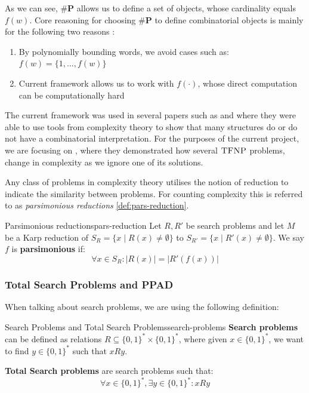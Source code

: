 As we can see, $\textbf{\#P}$ allows us to define a set of objects,
whose cardinality equals $f(w)$. Core reasoning for choosing
$\textbf{\#P}$ to define combinatorial objects is mainly for the 
following two reasons \cite{ikenmeyer_PositivitySymmetricGroup_2024}: 

\begin{enumerate}
    \item By polynomially bounding words, we avoid cases such as: $f(w) = \{1, \hdots, f(w)\}$
    \item Current framework allows us to work with $f(\cdot)$, whose direct computation can be computationally hard
\end{enumerate}


The current framework was used in several papers such as
\cite{ikenmeyer_WhatWhatNot_2022} and \cite{ikenmeyer_PositivitySymmetricGroup_2024}
where they were able to use tools from complexity theory to show that
many structures do or do not have a combinatorial interpretation.
For the purposes of the current project, we are focusing on \cite{ikenmeyer_WhatWhatNot_2022},
where they demonstrated how several $\textsc{TFNP}$ problems, 
change in complexity as we ignore one of its solutions.


Any class of problems in complexity theory utilises the notion of reduction
to indicate the similarity between problems. For counting complexity
this is referred to as \textit{parsimonious reductions} \ref{def:pars-reduction}.


\begin{definitionbox}{Parsimonious reductions}{pars-reduction}
    Let $R, R'$ be search problems and let $M$ be a Karp reduction of
    $S_R = \{x \mid R(x) \neq \emptyset \}$ to $S_{R'} = \{x \mid R'(x) \neq \emptyset \}$.
    We say $f$ is \textbf{parsimonious} if:
    $$
    \forall x \in S_R : |R(x)| = |R'(f(x))|
    $$ 
\end{definitionbox}

\subsubsection{Total Search Problems and PPAD}
When talking about search problems, we are using the following definition:

\begin{definitionbox}{Search Problems and Total Search Problems}{search-problems}
    \textbf{Search problems} can be defined as relations $R \subseteq \{0,1\}^* \times \{0,1\}^*$,
    where given $x \in \{0,1\}^*$, we want to find $y \in \{0,1\}^*$  such that $x Ry$.

    \textbf{Total Search problems} are search problems such that:
    $$
    \forall x \in \{0,1\}^*, \exists y \in \{0,1\}^* : xRy
    $$
\end{definitionbox}

